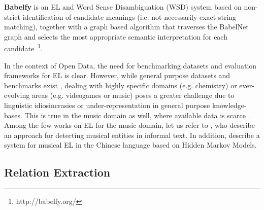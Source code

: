 \vspace{-0.2cm}
\noindent \textbf{Babelfy} \citep{Moroetal2014b} is an EL and Word Sense Disambiguation (WSD) system based on non-strict identification of candidate meanings (i.e. not necessarily exact string matching), together with a graph based algorithm that traverses the BabelNet graph and selects the most appropriate semantic interpretation for each candidate~\footnote{http://babelfy.org/}.

In the context of Open Data, the need for benchmarking datasets and evaluation frameworks for EL is clear. However, while general purpose datasets and benchmarks exist \citep{Usbeck2015}, dealing with highly specific domains (e.g. chemistry) or ever-evolving areas (e.g. videogames or music) poses a greater challenge due to linguistic idiosincrasies or under-representation in general purpose knowledge-bases. This is true in the music domain as well, where available data is scarce \citep{Gruhl2009}.
Among the few works on EL for the music domain, let us refer to \citep{Gruhl2009}, who describe an approach for detecting musical entities in informal text. In addition, \citep{Zhang2009} describe a system for musical EL in the Chinese language based on Hidden Markov Models. %



\subsection{Relation Extraction}
\label{sec:SOA:nlu:relation_extraction}



